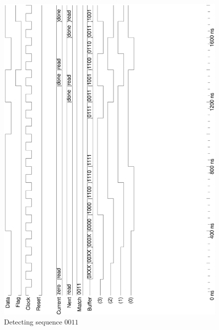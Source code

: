 \documentclass[10pt,a4paper]{report}
\begin{document}
\begin{figure} \center

\includegraphics[scale=0.49,angle=-90]{graphs/seq_test1.ps}
\caption{\small{Detecting sequence $0011$}} \label{wave:usd:t1w1}


\end{figure}
\end{document}

